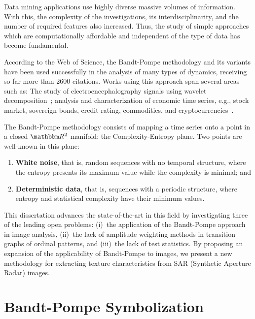 \documentclass[a4,11pt]{pssbmac}
\begin{document}
	Data mining applications use highly diverse massive volumes of information.
	With this, the complexity of the investigations, its interdisciplinarity, and the number of required features also increased.
	Thus, the study of simple approaches which are computationally affordable and independent of the type of data has become fundamental.
	
	According to the Web of Science, the Bandt-Pompe methodology and its variants have been used successfully in the analysis of many types of dynamics, receiving so far more than \num{2600} citations.
	Works using this approach span several areas such as:
	The study of electroencephalography signals using wavelet decomposition~\cite{baravalle2018discriminating};
	analysis and characterization of economic time series, e.g., stock market, sovereign bonds, credit rating, commodities, and cryptocurrencies~\cite{Araujo2019permutation}.
	
	The Bandt-Pompe methodology consists of mapping a time series onto a point in a closed $\mathbbm R^2$ manifold: the Complexity-Entropy plane.
	Two points are well-known in this plane:
	\begin{enumerate}
		\item \textbf{White noise}, that is, random sequences with no temporal structure, where the entropy presents its maximum value while the complexity is minimal; and
		\item \textbf{Deterministic data}, that is, sequences with a periodic structure, where entropy and statistical complexity have their minimum values.
	\end{enumerate}
	
	This dissertation advances the state-of-the-art in this field by investigating three of the leading open problems: 
	(i)~the application of the Bandt-Pompe approach in image analysis,
	(ii)~the lack of amplitude weighting methods in transition graphs of ordinal patterns, and 
	(iii)~the lack of test statistics.
	By proposing an expansion of the applicability of Bandt-Pompe to images, we present a new methodology for extracting texture characteristics from SAR (Synthetic Aperture Radar) images.
	
	\section{Bandt-Pompe Symbolization}\label{BP}
	
\end{document}
